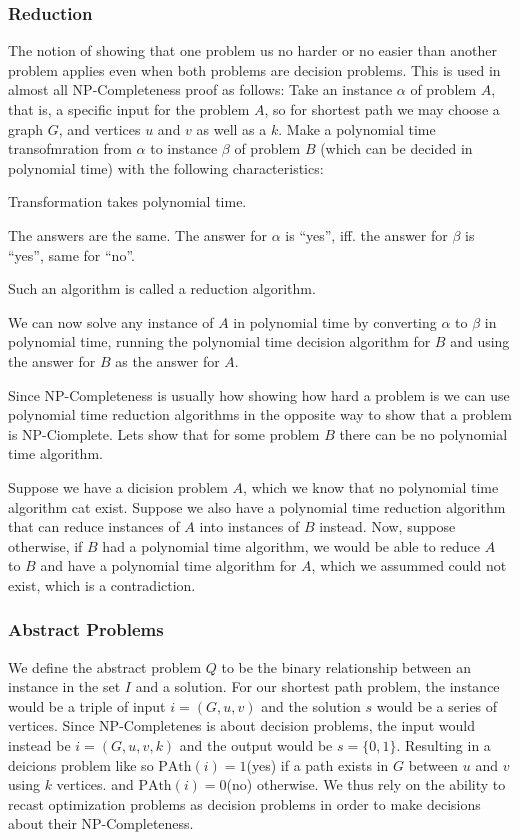 \subsubsection{Reduction}
The notion of showing that one problem us no harder or no easier than another
problem applies even when both problems are decision problems. This is used in
almost all NP-Completeness proof as follows: Take an instance $\alpha$ of
problem $A$, that is, a specific input for the problem $A$, so for shortest path
we may choose a graph $G$, and vertices $u$ and $v$ as well as a $k$. Make a
polynomial time transofmration from $\alpha$ to instance $\beta$ of problem $B$
(which can be decided in polynomial time) with the following characteristics:
\begin{enumerate*}
\item Transformation takes polynomial time.
\item The answers are the same. The answer for $\alpha$ is ``yes'', iff. the
  answer for $\beta$ is ``yes'', same for ``no''.
\end{enumerate*}
Such an algorithm is called a reduction algorithm.

We can now solve any instance of $A$ in polynomial time by converting $\alpha$
to $\beta$ in polynomial time, running the polynomial time decision algorithm
for $B$ and using the answer for $B$ as the answer for $A$.


Since NP-Completeness is usually how showing how hard a problem is we can use
polynomial time reduction algorithms in the opposite way to show that a problem
is NP-Ciomplete. Lets show that for some problem $B$ there can be no polynomial
time algorithm.

Suppose we have a dicision problem $A$, which we know that no polynomial time
algorithm cat exist. Suppose we also have a polynomial time reduction algorithm
that can reduce instances of $A$ into instances of $B$ instead. Now, suppose
otherwise, if $B$ had a polynomial time algorithm, we would be able to reduce
$A$ to $B$ and have a polynomial time algorithm for $A$, which we assummed could
not exist, which is a contradiction.

\subsubsection{Abstract Problems}
We define the abstract problem $Q$ to be the binary relationship between an
instance in the set $I$ and a solution.  For our shortest path problem, the
instance would be a triple of input $i = (G,u,v)$ and the solution $s$ would be
a series of vertices. Since NP-Completenes is about decision problems, the input
would instead be $i = (G,u,v,k)$ and the output would be $s =
\{0,1\}$. Resulting in a deicions problem like so $\text{PAth}(i) = 1$(yes) if a
path exists in $G$ between $u$ and $v$ using $k$ vertices. and $\text{PAth}(i) =
0$(no) otherwise. We thus rely on the ability to recast optimization problems as
decision problems in order to make decisions about their NP-Completeness.


